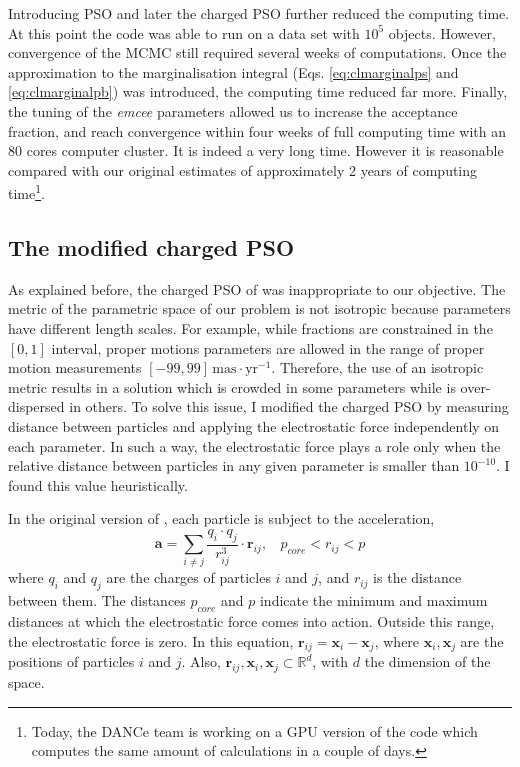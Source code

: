 Introducing PSO and later the charged PSO further reduced the computing time.  At this point the code was able to run on a data set with $10^5$ objects. However, convergence of the MCMC still required several weeks of computations. Once the approximation to the marginalisation integral (Eqs. \ref{eq:clmarginalps} and \ref{eq:clmarginalpb}) was introduced, the computing time reduced far more. Finally, the tuning of the \emph{emcee} parameters allowed us to increase the acceptance fraction, and reach convergence within four weeks of full computing time with an 80 cores computer cluster. It is indeed a very long time. However it is reasonable compared with our original estimates of approximately 2 years of computing time\footnote{Today, the DANCe team is working on a GPU version of the code which computes the same amount of calculations in a couple of days.}.

\subsection{The modified charged PSO}
\label{sect:chargedPSO}
As explained before, the charged PSO of \citet{Blackwell2002} was inappropriate to our objective. The metric of the parametric space of our problem is not isotropic because parameters have different length scales. For example, while fractions are constrained in the $[0,1]$ interval, proper motions parameters are allowed in the range of proper motion measurements $[-99,99]\,\mathrm{mas\cdot yr^{-1}}$. Therefore, the use of an isotropic metric results in a solution which is crowded in some parameters while is over-dispersed in others. 
To solve this issue, I modified the charged PSO by measuring distance between particles and applying the electrostatic force independently on each parameter. In such a way, the electrostatic force plays a role only when the relative distance between particles in any given parameter is smaller than $10^{-10}$. I found this value heuristically.

In the original version of  \citet{Blackwell2002}, each particle is subject to the acceleration,
\begin{equation}
\label{eq:PSOacc}
\mathbf{a}=\sum_{i\neq j} \frac{q_i \cdot q_j }{r_{ij}^3} \cdot \mathbf{r}_{ij}, \ \ \ \ p_{core} < r_{ij} < p
\end{equation}
where $q_i$ and $q_j$ are the charges of particles $i$ and $j$, and $r_{ij}$ is the distance between them. The distances $p_{core}$ and $p$ indicate the minimum and maximum distances at which the electrostatic force comes into action. Outside this range, the electrostatic force is zero. In this equation, $\mathbf{r}_{ij}= \mathbf{x}_i -\mathbf{x}_j$, where $\mathbf{x}_i,\mathbf{x}_j$ are the positions of particles $i$ and $j$. Also, $\mathbf{r}_{ij},\mathbf{x}_i,\mathbf{x}_j \subset \mathbb{R}^d$, with $d$ the dimension of the space. 

